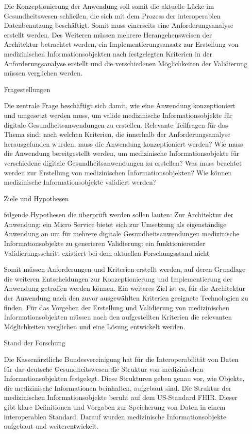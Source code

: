 Die Konzeptionierung der Anwendung soll somit die aktuelle Lücke im Gesundheitswesen schließen, die sich mit dem Prozess der interoperablen Datenbenutzung beschäftigt. Somit muss einerseits eine Anforderungsanalyse erstellt werden. Des Weiteren müssen mehrere Herangehensweisen der Architektur betrachtet werden, ein Implementierungsansatz zur Erstellung von medizinischen Informationsobjekten nach festgelegten Kriterien in der Anforderungsanalyse erstellt und die verschiedenen Möglichkeiten der Validierung müssen verglichen werden.

Fragestellungen

Die zentrale Frage beschäftigt sich damit, wie eine Anwendung konzeptioniert und umgesetzt werden muss, um valide medizinische Informationsobjekte für digitale Gesundheitsanwendungen zu erstellen. 
Relevante Teilfragen für das Thema sind:
nach welchen Kriterien, die innerhalb der Anforderungsanalyse  herausgefunden wurden, muss die Anwendung konzeptioniert werden?
Wie muss die Anwendung bereitgestellt werden, um medizinische Informationsobjekte für verschiedene digitale Gesundheitsanwendungen zu erstellen?
Was muss beachtet werden zur Erstellung von medizinischen Informationsobjekten?
Wie können medizinische Informationsobjekte validiert werden?

Ziele und Hypothesen

folgende Hypothesen die überprüft werden sollen lauten:
Zur Architektur der Anwendung:
ein Micro Service bietet sich zur Umsetzung als eigenständige Anwendung an um für mehrere digitale Gesundheitsanwendungen medizinische Informationsobjekte zu generieren
Validierung: 
ein funktionierender Validierungsschritt existiert bei dem aktuellen Forschungsstand nicht

Somit müssen Anforderungen und Kriterien erstellt werden, auf deren Grundlage die weiteren Entscheidungen zur Konzeptionierung und Implementierung der Anwendung getroffen werden können. Ein weiteres Ziel ist es, für die Architektur der Anwendung nach den zuvor ausgewählten Kriterien geeignete Technologien zu finden.
Für das Vorgehen der Erstellung und Validierung von medizinischen Informationsobjekten müssen nach den aufgestellten Kriterien die relevanten Möglichkeiten verglichen und eine Lösung entwickelt werden. 

Stand der Forschung
		
Die Kassenärztliche Bundesvereinigung hat für die Interoperabilität von Daten für das deutsche Gesundheitswesen die Struktur von medizinischen Informationsobjekten festgelegt. Diese Strukturen geben genau vor, wie Objekte, die medizinische Informationen beinhalten, aufgebaut sind. Die Struktur der medizinischen Informationsobjekte beruht auf dem US-Standard FHIR. Dieser gibt klare Definitionen und Vorgaben zur Speicherung von Daten in einem interoperablen Standard. Darauf wurden medizinische Informationsobjekte aufgebaut und weiterentwickelt. 


